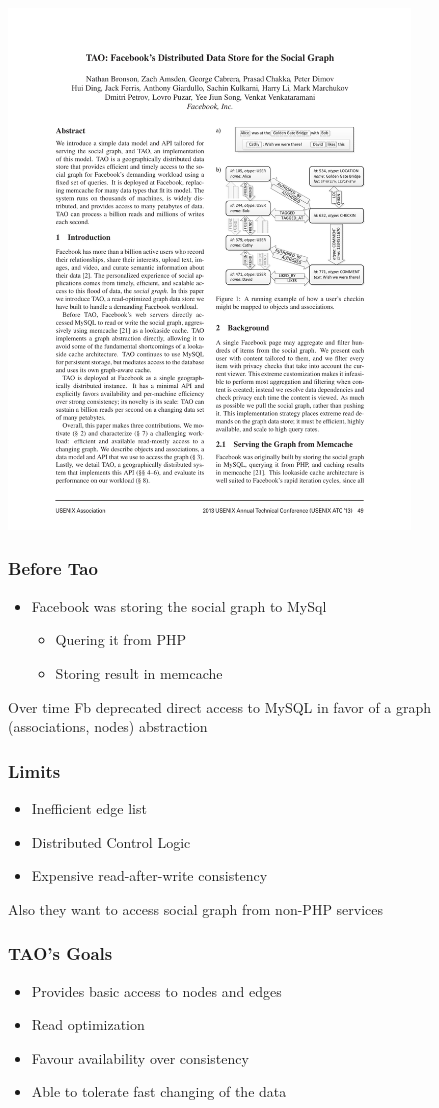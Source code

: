 \begin{frame}[t]
\begin{center}
\includegraphics[width=0.8\textwidth]{figs/social2}	
\end{center}


\end{frame}

\begin{frame}
\frametitle{Before Tao}
	\begin{itemize}
 	\item Facebook was storing the social graph to MySql
	\begin{itemize}
		\item  	Quering it from PHP
		\item  	Storing result in memcache\\
	\end{itemize}
	\end{itemize}
 	Over time Fb deprecated direct access to MySQL in favor of a graph (associations, nodes) abstraction
\end{frame}

\begin{frame}
\frametitle{Limits}
    \begin{itemize}
    	\item Inefficient edge list
    	\item Distributed Control Logic
    	\item Expensive read-after-write consistency
    \end{itemize}
Also they want to access social graph from non-PHP services
\end{frame}

\begin{frame}
\frametitle{TAO's Goals}
	\begin{itemize}
		\item Provides basic access to nodes and edges
		\pause
		\item Read optimization
		\pause
		\item Favour availability over consistency
		\pause
		\item Able to tolerate fast changing of the data
	\end{itemize}
\end{frame}

